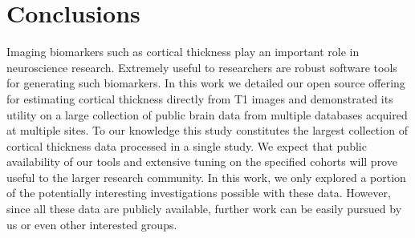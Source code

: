 \section{Conclusions}

Imaging biomarkers such as cortical thickness play an 
important role in neuroscience research.  Extremely useful to
researchers are robust software tools for generating such 
biomarkers.  In this work we detailed our open source offering for estimating
cortical thickness directly from T1 images and demonstrated
its utility on a large collection of public brain data from
multiple databases acquired at multiple sites.  To our knowledge
this study constitutes the largest collection of cortical
thickness data processed in a single study.  
We expect that public availability of our tools and extensive tuning on 
the specified cohorts will prove useful to the larger
research community.   In this work, we only explored a portion of the potentially
interesting investigations possible with these data.  However,
since all these data are publicly available, further work can
be easily pursued by us or even other interested groups.  